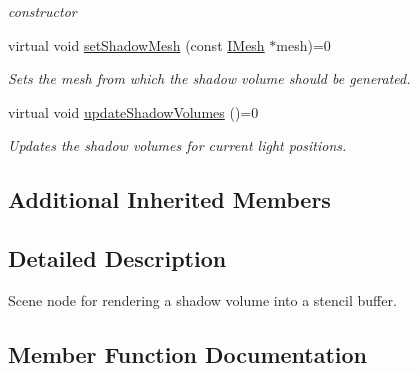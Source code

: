 \begin{DoxyCompactItemize}
\begin{DoxyCompactList}\small\item\em constructor \end{DoxyCompactList}\item 
virtual void \hyperlink{classirr_1_1scene_1_1IShadowVolumeSceneNode_a69af3aa713c909106bacccdbab01184d}{set\+Shadow\+Mesh} (const \hyperlink{classirr_1_1scene_1_1IMesh}{I\+Mesh} $\ast$mesh)=0
\begin{DoxyCompactList}\small\item\em Sets the mesh from which the shadow volume should be generated. \end{DoxyCompactList}\item 
\mbox{\label{classirr_1_1scene_1_1IShadowVolumeSceneNode_a3fa8470e9aa103a449eb365bfff4ef13}} 
virtual void \hyperlink{classirr_1_1scene_1_1IShadowVolumeSceneNode_a3fa8470e9aa103a449eb365bfff4ef13}{update\+Shadow\+Volumes} ()=0
\begin{DoxyCompactList}\small\item\em Updates the shadow volumes for current light positions. \end{DoxyCompactList}\end{DoxyCompactItemize}
\subsection*{Additional Inherited Members}


\subsection{Detailed Description}
Scene node for rendering a shadow volume into a stencil buffer. 

\subsection{Member Function Documentation}
\mbox{\label{classirr_1_1scene_1_1IShadowVolumeSceneNode_a69af3aa713c909106bacccdbab01184d}} 
